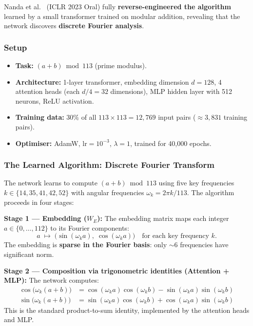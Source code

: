 \documentclass[11pt, a4paper]{article}
\theoremstyle{definition}
\theoremstyle{plain}
\begin{document}
Nanda et al.~\cite{nanda2023grokking} (ICLR 2023 Oral) fully \textbf{reverse-engineered the algorithm} learned by a small transformer trained on modular addition, revealing that the network discovers \textbf{discrete Fourier analysis}.

\subsubsection{Setup}

\begin{itemize}
  \item \textbf{Task:} $(a + b) \bmod 113$ (prime modulus).
  \item \textbf{Architecture:} 1-layer transformer, embedding dimension $d = 128$, 4 attention heads (each $d/4 = 32$ dimensions), MLP hidden layer with 512 neurons, ReLU activation.
  \item \textbf{Training data:} 30\% of all $113 \times 113 = 12{,}769$ input pairs (${\approx}3{,}831$ training pairs).
  \item \textbf{Optimiser:} AdamW, $\text{lr} = 10^{-3}$, $\lambda = 1$, trained for 40{,}000 epochs.
\end{itemize}

\subsubsection{The Learned Algorithm: Discrete Fourier Transform}

The network learns to compute $(a + b) \bmod 113$ using five key frequencies $k \in \{14, 35, 41, 42, 52\}$ with angular frequencies $\omega_k = 2\pi k / 113$. The algorithm proceeds in four stages:

\textbf{Stage 1 --- Embedding ($W_E$):} The embedding matrix maps each integer $a \in \{0, \ldots, 112\}$ to its Fourier components:
\begin{equation}
  a \;\longmapsto\; \bigl(\sin(\omega_k a),\; \cos(\omega_k a)\bigr) \quad \text{for each key frequency } k.
\end{equation}
The embedding is \textbf{sparse in the Fourier basis}: only ${\sim}6$ frequencies have significant norm.

\textbf{Stage 2 --- Composition via trigonometric identities (Attention + MLP):} The network computes:
\begin{align}
  \cos\bigl(\omega_k(a + b)\bigr) &= \cos(\omega_k a)\cos(\omega_k b) - \sin(\omega_k a)\sin(\omega_k b) \label{eq:trig-cos}\\
  \sin\bigl(\omega_k(a + b)\bigr) &= \sin(\omega_k a)\cos(\omega_k b) + \cos(\omega_k a)\sin(\omega_k b) \label{eq:trig-sin}
\end{align}
This is the standard product-to-sum identity, implemented by the attention heads and MLP.
\end{document}
